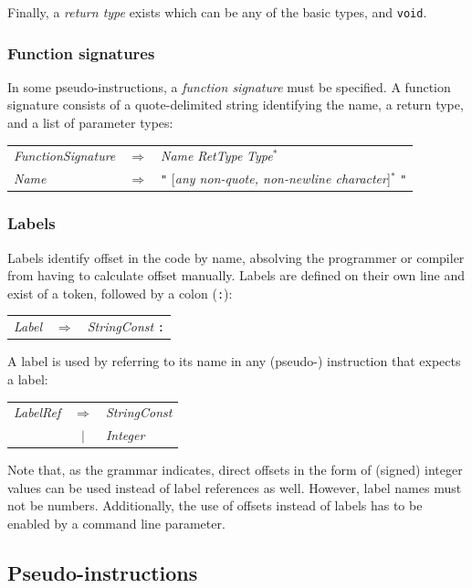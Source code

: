 Finally, a \emph{return type} exists which can be any of the basic types, and \texttt{void}.

\subsubsection{Function signatures}
In some pseudo-instructions, a \emph{function signature} must be specified. A function signature consists of a quote-delimited string identifying the name, a return type, and a list of parameter types:

\begin{tabular}{lcl}
\emph{FunctionSignature} &$\Rightarrow$& \emph{Name} \emph{RetType} \emph{Type}$^*$ \\
\emph{Name}              &$\Rightarrow$& \texttt{"} [\emph{any non-quote, non-newline character}]$^*$ \texttt{"} \\
\end{tabular}

\subsubsection{Labels}
Labels identify offset in the code by name, absolving the programmer or compiler from having to calculate offset manually. Labels are defined on their own line and exist of a token, followed by a colon (\texttt{:}):

\begin{tabular}{lcl}
\emph{Label} &$\Rightarrow$& \emph{StringConst} \texttt{:} \\
\end{tabular}

A label is used by referring to its name in any (pseudo-) instruction that expects a label:

\begin{tabular}{lcl}
\emph{LabelRef} &$\Rightarrow$& \emph{StringConst} \\
                &$\mid$& \emph{Integer} \\
\end{tabular}

Note that, as the grammar indicates, direct offsets in the form of (signed) integer values can be used instead of label references as well. However, label names must not be numbers. Additionally, the use of offsets instead of labels has to be enabled by a command line parameter.

\subsection{Pseudo-instructions}

